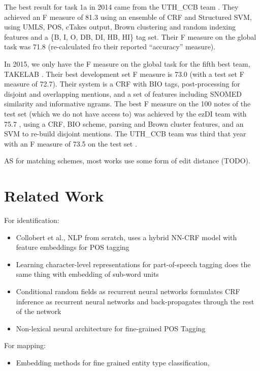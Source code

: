 \documentclass[10pt,a4paper]{article}
\begin{document}
  The best result for task 1a in 2014 came from the UTH\_CCB team \cite{tang2014uth_ccb}. They achieved an F measure of 81.3 using an ensemble of CRF and Structured SVM, using UMLS, POS, cTakes output, Brown clustering and random indexing features and a \{B, I, O, DB, DI, HB, HI\} tag set. Their F measure on the global task was 71.8 (re-calculated fro their reported ``accuracy'' measure).
  
  In 2015, we only have the F measure on the global task for the fifth best team, TAKELAB \cite{glavavstakelab}. Their best development set F measure is 73.0 (with a test set F measure of 72.7). Their system is a CRF with BIO tags, post-processing for disjoint and overlapping mentions, and a set of features including SNOMED similarity and informative ngrams. The best F measure on the 100 notes of the test set (which we do not have access to) was achieved by the ezDI team with 75.7 \cite{pathak2015ezdi}, using a CRF, BIO scheme, parsing and Brown cluster features, and an SVM to re-build disjoint mentions. The UTH\_CCB team was third that year with an F measure of 73.5 on the test set \cite{xu2015uth}.
  
  AS for matching schemes, most works use some form of edit distance (TODO).
  

\section{Related Work}

For identification:
\begin{itemize}
\item Collobert et al., NLP from scratch, uses a hybrid NN-CRF model with feature embeddings for POS tagging \cite{collobert2011natural}
\item Learning character-level representations for part-of-speech tagging does the same thing with embedding of sub-word units \cite{santos2014learning}
\item Conditional random fields as recurrent neural networks formulates CRF inference as recurrent neural networks and back-propagates through the rest of the network \cite{zheng2015conditional}
\item Non-lexical neural architecture for fine-grained POS Tagging \cite{labeau2015non}
\end{itemize}

For mapping:
\begin{itemize}
\item Embedding methods for fine grained entity type classification, \cite{yogatama2015embedding} 
\end{itemize}
\end{document}
